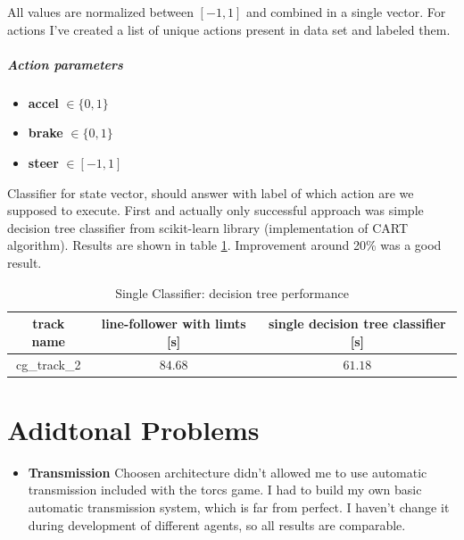 \documentclass[declaration,shortabstract,english,inz]{iithesis}
\begin{document}
All values are normalized between $[-1,1]$ and combined in a single vector. For actions I've created a list of unique actions present in data set and labeled them. 

\paragraph{Action parameters}
\begin{itemize}
    \item \textbf{accel} $\in \{0,1\}$
    \item \textbf{brake} $\in \{0,1\}$ 
    \item \textbf{steer} $\in [-1,1]$
\end{itemize}

Classifier for state vector, should answer with label of which action are we supposed to execute. First and actually only successful approach was  simple decision tree classifier from scikit-learn library (implementation of CART algorithm).  Results are shown in table \ref{tab:single_clp_tree}. Improvement around 20\% was a good result. 


\begin{table}[h]
    \centering
    \begin{tabular}{ |c|c|c|}
          \hline
          track name & line-follower with limts [s] & single decision tree classifier [s] \\
          \hline
          cg\_track\_2 & $84.68$ & $61.18$ \\
          \hline
        \end{tabular}
        \caption{Single Classifier: decision tree performance}
        \label{tab:single_clp_tree}

\end{table}









    \chapter{Adidtonal Problems}

\begin{itemize}
    \item \textbf{Transmission} Choosen architecture didn't allowed me to use automatic transmission included with the torcs game. I had to build my own basic automatic transmission system, which is far from perfect. I haven't change it during development of different agents, so all results are comparable. 
\end{itemize}
\end{document}
